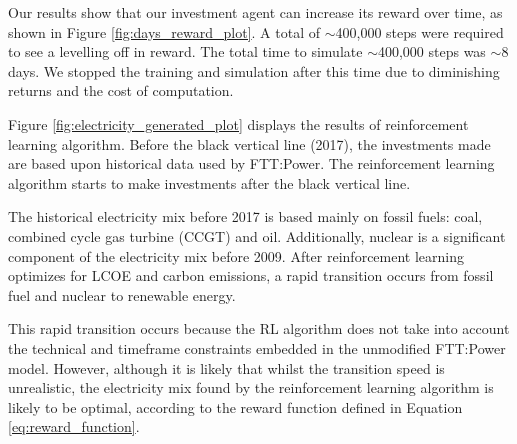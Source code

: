 \documentclass{article}
\begin{document}
Our results show that our investment agent can increase its reward over time, as shown in Figure \ref{fig:days_reward_plot}. A total of ${\sim}$400,000 steps were required to see a levelling off in reward. The total time to simulate ${\sim}$400,000 steps was ${\sim}$8 days. We stopped the training and simulation after this time due to diminishing returns and the cost of computation.

Figure \ref{fig:electricity_generated_plot} displays the results of reinforcement learning algorithm. Before the black vertical line (2017), the investments made are based upon historical data used by FTT:Power. The reinforcement learning algorithm starts to make investments after the black vertical line. 


The historical electricity mix before 2017 is based mainly on fossil fuels: coal, combined cycle gas turbine (CCGT) and oil. Additionally, nuclear is a significant component of the electricity mix before 2009. After reinforcement learning optimizes for LCOE and carbon emissions, a rapid transition occurs from fossil fuel and nuclear to renewable energy. 

This rapid transition occurs because the RL algorithm does not take into account the technical and timeframe constraints embedded in the unmodified FTT:Power model. However, although it is likely that whilst the transition speed is unrealistic, the electricity mix found by the reinforcement learning algorithm is likely to be optimal, according to the reward function defined in Equation \ref{eq:reward_function}.



\end{document}
